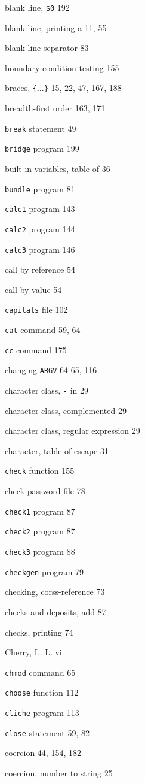 \begin{multicols}{2}
blank line, \verb'$0' 192

blank line, printing a 11, 55

blank line separator 83

boundary condition testing 155

braces, \verb'{'...\verb'}' 15, 22, 47, 167, 188

breadth-first order 163, 171

\verb'break' statement 49

\verb'bridge' program 199

built-in variables, table of 36

\verb'bundle' program 81

\verb'calc1' program 143

\verb'calc2' program 144

\verb'calc3' program 146

call by reference 54

call by value 54

\verb'capitals' file 102

\verb'cat' command 59, 64

\verb'cc' command 175

changing \verb'ARGV' 64-65, 116

character class, \verb'-' in 29

character class, complemented 29

character class, regular expression 29

character, table of escape 31

\verb'check' function 155

check password file 78

\verb'check1' program 87

\verb'check2' program 87

\verb'check3' program 88

\verb'checkgen' program 79

checking, corss-reference 73

checks and deposits, add 87

checks, printing 74

Cherry, L. L. vi

\verb'chmod' command 65

\verb'choose' function 112

\verb'cliche' program 113

\verb'close' statement 59, 82

coercion 44, 154, 182

coercion, number to string 25


\end{multicols}
